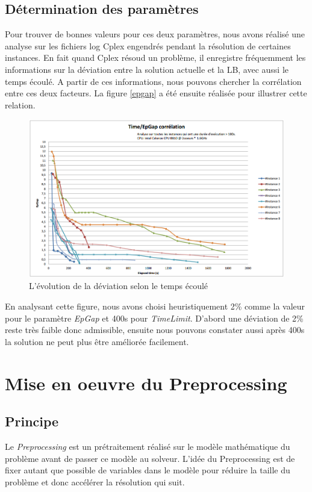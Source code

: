 \subsection{Détermination des paramètres}
Pour trouver de bonnes valeurs pour ces deux paramètres, nous avons réalisé une analyse sur les fichiers log Cplex engendrés pendant la résolution de certaines instances. En fait quand Cplex résoud un problème, il enregistre fréquemment les informations sur la déviation entre la solution actuelle et la LB, avec aussi le temps écoulé. A partir de ces informations, nous pouvons chercher la corrélation entre ces deux facteurs. La figure \ref{epgap} a été ensuite réalisée pour illustrer cette relation.

\begin{figure}[!htbp]
	\centering
		\includegraphics[scale=0.5]{pics/epgap.png}
	\caption{L'évolution de la déviation selon le temps écoulé}
	\label{fig:epgap}
\end{figure}
\bigskip
En analysant cette figure, nous avons choisi heuristiquement 2\% comme la valeur pour le paramètre \textit{EpGap} et 400s pour \textit{TimeLimit}. D'abord une déviation de 2\% reste très faible donc admissible, ensuite nous pouvons constater aussi après 400s la solution ne peut plus être améliorée facilement.

\section{Mise en oeuvre du Preprocessing}%
\subsection{Principe}
Le \textit{Preprocessing} est un prétraitement réalisé sur le modèle mathématique du problème avant de passer ce modèle au solveur. L'idée du Preprocessing est de fixer autant que possible de variables dans le modèle pour réduire la taille du problème et donc accélérer la résolution qui suit.

